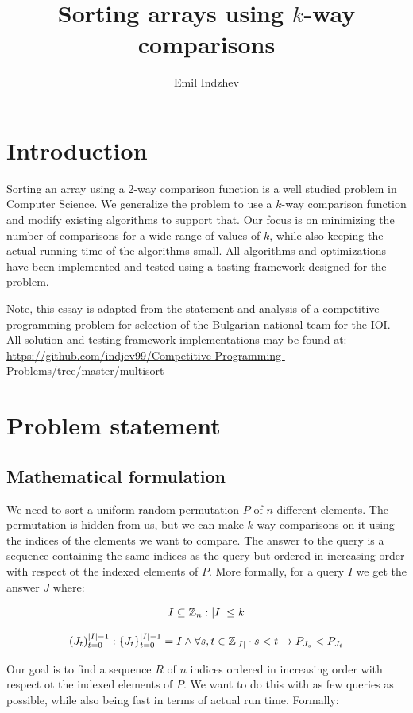 \documentclass{article}
\title{Sorting arrays using $k$-way comparisons}
\author{Emil Indzhev}
\DeclarePairedDelimiter{\set}{\{}{\}}
\DeclarePairedDelimiter{\abs}{\lvert}{\rvert}
\begin{document}
\maketitle

\section{Introduction}

Sorting an array using a 2-way comparison function is a well studied problem in Computer Science. We generalize the problem to use a $k$-way comparison function and modify existing algorithms to support that. Our focus is on minimizing the number of comparisons for a wide range of values of $k$, while also keeping the actual running time of the algorithms small. All algorithms and optimizations have been implemented and tested using a tasting framework designed for the problem.

Note, this essay is adapted from the statement and analysis of a competitive programming problem for selection of the Bulgarian national team for the IOI. All solution and testing framework implementations may be found at: \\
\url{https://github.com/indjev99/Competitive-Programming-Problems/tree/master/multisort}

\section{Problem statement}

\subsection{Mathematical formulation}

We need to sort a uniform random permutation $ P $ of $ n $ different elements. The permutation is hidden from us, but we can make $k$-way comparisons on it using the indices of the elements we want to compare. The answer to the query is a sequence containing the same indices as the query but ordered in increasing order with respect ot the indexed elements of $ P $. More formally, for a query $ I $ we get the answer $ J $ where:

$$ I \subseteq \mathbb{Z}_n : \abs{I} \leq k $$

$$ (J_t)_{t=0}^{\abs{I} - 1}  : \set{J_t}_{t=0}^{\abs{I} - 1} = I \land \forall s,t \in \mathbb{Z}_{\abs{I}} \cdot s < t \rightarrow P_{J_s} < P_{J_t} $$

Our goal is to find a sequence $ R $ of $ n $ indices ordered in increasing order with respect ot the indexed elements of $ P $. We want to do this with as few queries as possible, while also being fast in terms of actual run time. Formally:
\end{document}
